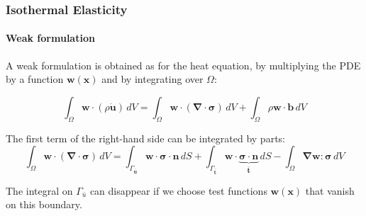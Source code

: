 \documentclass[10pt,xcolor=pdftex,dvipsnames,table]{beamer}
\begin{document}
\begin{frame}
	\frametitle{ Isothermal Elasticity }
	\framesubtitle{ Weak formulation }
	
	A weak formulation is obtained as for the heat equation, by multiplying the PDE by a function $\boldsymbol{w}(\boldsymbol{x})$ and by integrating over $\Omega$:
	
	\begin{equation*}
		\int_{\Omega} \boldsymbol{w}\cdot \left( \rho \ddot{\boldsymbol{u}} \right)\, dV 
		= \int_{\Omega} \boldsymbol{w}\cdot \left(\boldsymbol{\nabla}\cdot\boldsymbol{\sigma}\right)\, dV 
		+ \int_{\Omega} \rho \boldsymbol{w}\cdot \boldsymbol{b}\, dV
	\end{equation*}	


	The first term of the right-hand side can be integrated by parts:
	\begin{equation*}
	\int_{\Omega} \boldsymbol{w}\cdot \left(\boldsymbol{\nabla}\cdot\boldsymbol{\sigma}\right)\, dV 
	= \int_{\Gamma_{\bar{\boldsymbol{u}}}} \boldsymbol{w}\cdot \boldsymbol{\sigma} \cdot \boldsymbol{n}\, dS
	+ \int_{\Gamma_{\bar{\boldsymbol{t}}}} \boldsymbol{w}\cdot \underbrace{\boldsymbol{\sigma} \cdot \boldsymbol{n}}_{\boldsymbol{\bar{t}}}\, dS
	- \int_{\Omega} \boldsymbol{\nabla}\boldsymbol{w} : \boldsymbol{\sigma}\, dV
	\end{equation*}	
	
	The integral on $\Gamma_{\bar{u}}$ can disappear if we choose test functions $\boldsymbol{w}(\boldsymbol{x})$ that vanish on this boundary.
\end{frame}
\end{document}
